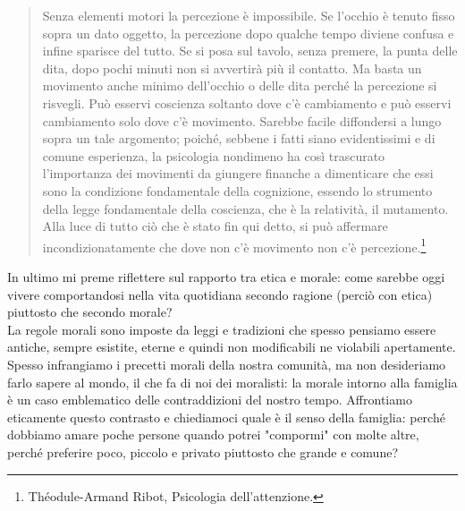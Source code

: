 \begin{quotation}
	\small Senza elementi motori la percezione è impossibile. Se l’occhio è tenuto fisso sopra un dato oggetto, la percezione dopo qualche tempo diviene confusa e infine sparisce del tutto. Se si posa sul tavolo, senza premere, la punta delle dita, dopo pochi minuti non si avvertirà più il contatto. Ma basta un movimento anche minimo dell’occhio o delle dita perché la percezione si risvegli. Può esservi coscienza soltanto dove c’è cambiamento e può esservi cambiamento solo dove c’è movimento. Sarebbe facile diffondersi a lungo sopra un tale argomento; poiché, sebbene i fatti siano evidentissimi e di comune esperienza, la psicologia nondimeno ha così trascurato l’importanza dei movimenti da giungere finanche a dimenticare che essi sono la condizione fondamentale della cognizione, essendo lo strumento della legge fondamentale della coscienza, che è la relatività, il mutamento. Alla luce di tutto ciò che è stato fin qui detto, si può affermare incondizionatamente che dove non c’è movimento non c’è percezione.\footnote{Théodule-Armand Ribot, Psicologia dell'attenzione.}
\end{quotation}

In ultimo mi preme riflettere sul rapporto tra etica e morale: come sarebbe oggi vivere comportandosi nella vita quotidiana secondo ragione (perciò con etica) piuttosto che secondo morale?\\
La regole morali sono imposte da leggi e tradizioni che spesso pensiamo essere antiche, sempre esistite, eterne e quindi non modificabili ne violabili apertamente. Spesso infrangiamo i precetti morali della nostra comunità, ma non desideriamo farlo sapere al mondo, il che fa di noi dei moralisti: la morale intorno alla famiglia è un caso emblematico delle contraddizioni del nostro tempo.
Affrontiamo eticamente questo contrasto e chiediamoci quale è il senso della famiglia: perché dobbiamo amare poche persone quando  potrei "compormi" con molte altre, perché preferire poco, piccolo e privato piuttosto che grande e comune?



























\newpage